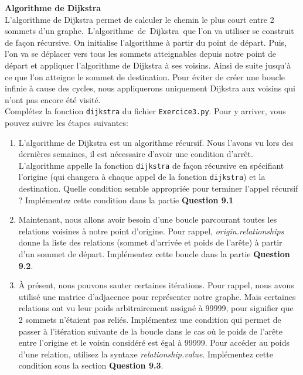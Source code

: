 \begin{Exercice}[15 minutes] \textbf{Algorithme de Dijkstra \optionnel}\\
    L'algorithme de Dijkstra permet de calculer le chemin le plus court entre 2 sommets d'un graphe.~L'algorithme~de~Dijkstra~que l'on va utiliser se construit de façon récursive. On initialise l'algorithme à partir du point de départ. Puis, l'on va se déplacer vers tous les sommets atteignables depuis notre point de départ et appliquer l'algorithme de Dijkstra à ses voisins. Ainsi de suite jusqu'à ce que l'on atteigne le sommet de destination. Pour éviter de créer une boucle infinie à cause des cycles, nous appliquerons uniquement Dijkstra aux voisins qui n'ont pas encore été visité.\\
    
    Complétez la fonction \lstinline{dijkstra} du fichier \lstinline{Exercice3.py}. Pour y arriver, vous pouvez suivre les étapes suivantes:
    \begin{enumerate}
        \item L'algorithme de Dijkstra est un algorithme récursif. Nous l'avons vu lors des dernières semaines, il est nécessaire d'avoir une condition d'arrêt. L'algorithme appelle la fonction \lstinline{dijkstra} de façon récursive en spécifiant l'origine (qui changera à chaque appel de la fonction \lstinline{dijkstra}) et la destination. Quelle condition semble appropriée pour terminer l'appel récursif ? Implémentez cette condition dans la partie \textbf{Question 9.1}
        
        \item Maintenant, nous allons avoir besoin d'une boucle parcourant toutes les relations voisines à notre point d'origine. Pour rappel, \textit{origin.relationships} donne la liste des relations (sommet d'arrivée et poids de l'arête) à partir d'un sommet de départ. Implémentez cette boucle dans la partie \textbf{Question 9.2}.
        
        \item À présent, nous pouvons sauter certaines itérations. Pour rappel, nous avons utilisé une matrice d'adjacence pour représenter notre graphe. Mais certaines relations ont vu leur poids arbitrairement assigné à 99999, pour signifier que 2 sommets n'étaient pas reliés. Implémentez une condition qui permet de passer à l'itération suivante de la boucle dans le cas où le poids de l'arête entre l'origine et le voisin considéré est égal à 99999. Pour accéder au poids d'une relation, utilisez la syntaxe \textit{relationship.value}. Implémentez cette condition sous la section \textbf{Question 9.3}.
        

\end{enumerate}
\end{Exercice}
